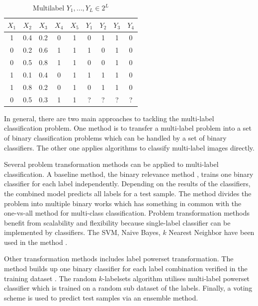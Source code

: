 \begin{table}
\centering
\begin{tabular}{|c c c c c | c c c c|}
\hline
$X_{1}$ & $X_{2}$ &  $X_{3}$ & $X_{4}$ & $X_{5}$ & $Y_{1}$ & $Y_{2}$ & $Y_{3}$ & $Y_{4}$ \\
\hline
1 & 0.4 & 0.2 & 0 & 1 & 0 & 1 & 1 & 0 \\
0 & 0.2 & 0.6 & 1 & 1 & 1 & 0 & 1 & 0 \\
0 & 0.5 & 0.8 & 1 & 1 & 0 & 0 & 1 & 0 \\
1 & 0.1 & 0.4 & 0 & 1 & 1 & 1 & 1 & 0 \\
1 & 0.8 & 0.2 & 0 & 1 & 0 & 1 & 1 & 0 \\
\hline
0 & 0.5 & 0.3 & 1 & 1 & ? & ? & ? & ? \\
\hline
\end{tabular}
\caption{Multilabel $Y_{1},...,Y_{L} \in 2^L$}
\label{tab:MultilabelTable}
\end{table}

In general, there are two main approaches to tackling the multi-label classification problem. One method is to transfer a multi-label problem into a set of binary classification problems which can be handled by a set of binary classifiers. The other one applies algorithms to classify multi-label images directly. 

Several problem transformation methods can be applied to multi-label classification. A baseline method, the binary relevance method \citep{read2011classifier}, trains one binary classifier for each label independently. Depending on the results of the classifiers, the combined model predicts all labels for a test sample. The method divides the problem into multiple binary works which has something in common with the one-vs-all method for multi-class classification. Problem transformation methods benefit from scalability and flexibility because single-label classifier can be implemented by classifiers. The SVM, Naive Bayes, $k$ Nearest Neighbor have been used in the method \citep{read2011classifier}.

Other transformation methods includes label powerset transformation. The method builds up one binary classifier for each label combination verified in the training dataset \citep{tsoumakas2006multi}. The random $k$-labelsets algorithm \citep{tsoumakas2007random} utilises multi-label powerset classifier which is trained on a random sub dataset of the labels. Finally, a voting scheme is used to predict test samples via an ensemble method.

